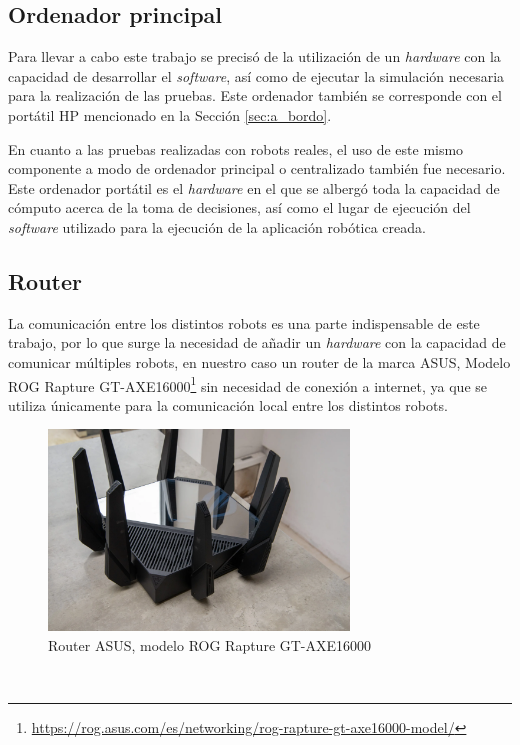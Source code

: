 \subsection{Ordenador principal}
\label{sec:ordenador_principal}

Para llevar a cabo este trabajo se precisó de la utilización de un
\textit{hardware} con la capacidad de desarrollar el \textit{software}, así como
de ejecutar la simulación necesaria para la realización de las pruebas.
Este ordenador también se corresponde con el portátil HP mencionado en la
Sección \ref{sec:a_bordo}.

En cuanto a las pruebas realizadas con robots reales, el uso de este mismo
componente a modo de ordenador principal o centralizado también fue necesario.
Este ordenador portátil es el \textit{hardware} en el que se albergó toda la
capacidad de cómputo acerca de la toma de decisiones, así como el lugar de
ejecución del \textit{software} utilizado para la ejecución de la aplicación
robótica creada.

\subsection{Router}
\label{sec:router}

La comunicación entre los distintos robots es una parte indispensable de este
trabajo, por lo que surge la necesidad de añadir un \textit{hardware} con la
capacidad de comunicar múltiples robots, en nuestro caso un router de la marca
ASUS, Modelo ROG Rapture
GT-AXE16000\footnote{\url{https://rog.asus.com/es/networking/rog-rapture-gt-axe16000-model/}}
sin necesidad de conexión a internet, ya que se utiliza únicamente para la
comunicación local entre los distintos robots.

\begin{figure} [h!]
  \begin{center}
    \includegraphics[width=8cm]{figs/asus_router}
  \end{center}
  \caption{Router ASUS, modelo ROG Rapture GT-AXE16000 \cite{asus_router}}
  \label{fig:asus_router}
\end{figure}\


